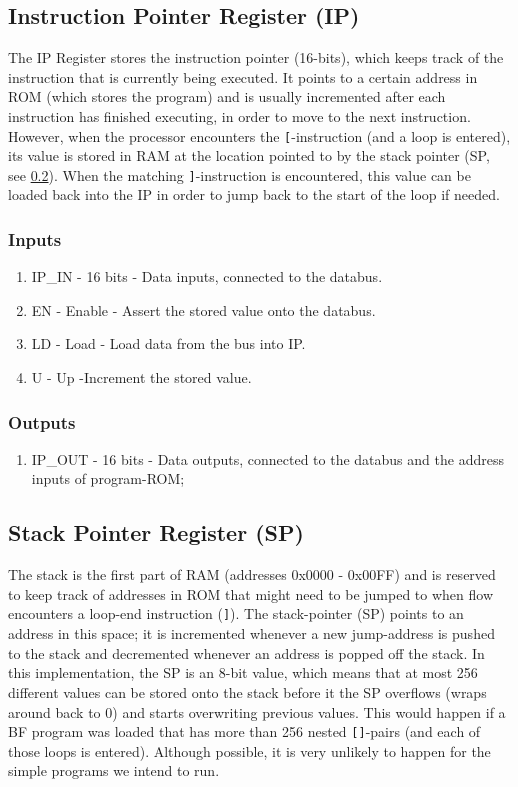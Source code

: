 \subsection{Instruction Pointer Register (IP)} \label{sec:architecture:ip}
The IP Register stores the instruction pointer (16-bits), which keeps track of the instruction that is currently being executed. It points to a certain address in ROM (which stores the program) and is usually incremented after each instruction has finished executing, in order to move to the next instruction. However, when the processor encounters the \texttt{[}-instruction (and a loop is entered), its value is stored in RAM at the location pointed to by the stack pointer (SP, see \ref{sec:architecture:sp}). When the matching \texttt{]}-instruction is encountered, this value can be loaded back into the IP in order to jump back to the start of the loop if needed.

\subsubsection*{Inputs}
\begin{enumerate}
\itemsep0em 
\item IP\_IN - 16 bits - Data inputs, connected to the databus.
\item EN - Enable - Assert the stored value onto the databus.
\item LD - Load - Load data from the bus into IP.
\item U - Up -Increment the stored value. 
\end{enumerate}

\subsubsection*{Outputs}
\begin{enumerate}
\itemsep0em 
\item IP\_OUT - 16 bits - Data outputs, connected to the databus and the address inputs of program-ROM;
\end{enumerate}


\subsection{Stack Pointer Register (SP)} \label{sec:architecture:sp}
The stack is the first part of RAM (addresses 0x0000 - 0x00FF) and is reserved to keep track of addresses in ROM that might need to be jumped to when flow encounters a loop-end instruction (\texttt{]}). The stack-pointer (SP) points to an address in this space; it is incremented whenever a new jump-address is pushed to the stack and decremented whenever an address is popped off the stack. In this implementation, the SP is an 8-bit value, which means that at most 256 different values can be stored onto the stack before it the SP overflows (wraps around back to 0) and starts overwriting previous values. This would happen if a BF program was loaded that has more than 256 nested \texttt{[]}-pairs (and each of those loops is entered). Although possible, it is very unlikely to happen for the simple programs we intend to run.

